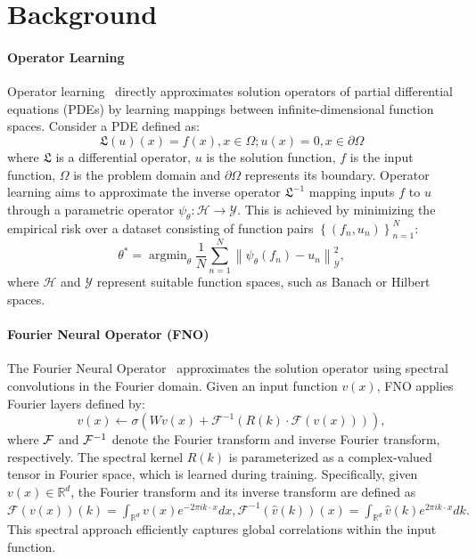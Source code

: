 \section{Background}\label{sect:bk}
\paragraph{Operator Learning} Operator learning~\citep{kovachki2023neural} directly approximates solution operators of partial differential equations (PDEs) by learning mappings between infinite-dimensional function spaces. Consider a PDE defined as:
\[
	\mathfrak{L}(u)(x) = f(x), x\in\Omega; u(x)=0, x\in\partial\Omega
\]
where $\mathfrak{L}$ is a differential operator, $u$ is the solution function, $f$ is the input function, $\Omega$ is the problem domain and $\partial\Omega$ represents its boundary.  Operator learning aims to approximate the inverse operator $\mathfrak{L}^{-1}$ mapping inputs $f$ to $u$ through a parametric operator  $\psi_\theta: \mathcal{H} \rightarrow \mathcal{Y}$. This is achieved by minimizing the empirical risk over a dataset consisting of function pairs $\left\{\left(f_n, u_n\right)\right\}_{n=1}^N$:
\[
	\theta^*=\operatorname{argmin}_\theta \frac{1}{N} \sum_{n=1}^N\left\|\psi_\theta\left(f_n\right)-u_n\right\|_{\mathcal{Y}}^2 ,
\]
where $\mathcal{H}$ and $\mathcal{Y}$ represent suitable function spaces, such as Banach or Hilbert spaces.


\paragraph{Fourier Neural Operator (FNO)} The Fourier Neural Operator~\citep{li2020fourier} approximates the solution operator using spectral convolutions in the Fourier domain. Given an input function $v(x)$, FNO applies Fourier layers defined by: 
\[
	v(x) \leftarrow \sigma\left(W v(x)+\mathcal{F}^{-1}(R(k) \cdot \mathcal{F}(v(x)))\right),
\]
where $\mathcal{F}$ and $\mathcal{F}^{-1}$ denote the Fourier transform and inverse Fourier transform, respectively. The spectral kernel $R(k)$ is parameterized as a complex-valued tensor in Fourier space, which is learned during training. Specifically, given $v(x) \in \mathbb{R}^d$, the Fourier transform and its inverse transform are defined as
$
\mathcal{F}(v(x))(k)=\int_{\mathbb{R}^d} v(x) e^{-2 \pi i k \cdot x} d x, \mathcal{F}^{-1}(\hat{v}(k))(x)=\int_{\mathbb{R}^d} \hat{v}(k) e^{2 \pi i k \cdot x} d k .
$
This spectral approach efficiently captures global correlations within the input function. 

